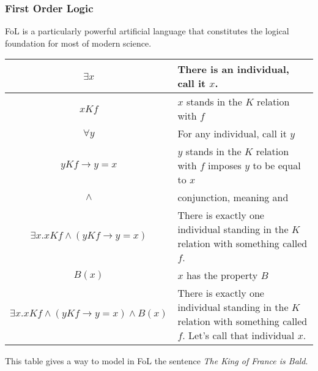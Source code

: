 \documentclass{cours}
\begin{document}
\subsubsection{First Order Logic}
FoL is a particularly powerful artificial language that constitutes the logical foundation for most of modern science.
\begin{center}
    \begin{tabular}{cp{}}
        $\exists x$                                                          & There is an individual, call it $x$.                                                                                    \\
        \midrule
        $xKf$                                                                & $x$ stands in the $K$ relation with $f$                                                                                 \\
        \midrule
        $\forall y$                                                          & For any individual, call it $y$                                                                                         \\
        \midrule
        $yKf \rightarrow y = x$                                              & $y$ stands in the $K$ relation with $f$ imposes $y$ to be equal to $x$                                                  \\
        \midrule
        $\wedge$                                                             & conjunction, meaning and                                                                                                \\
        \midrule
        $\exists x.xKf\wedge \left(yKf \rightarrow y = x\right)$             & There is exactly one individual standing in the $K$ relation with something called $f$.                                 \\
        \midrule
        $B(x)$                                                               & $x$ has the property $B$                                                                                                \\
        \midrule
        $\exists x.xKf\wedge \left(yKf \rightarrow y = x\right) \wedge B(x)$ & There is exactly one individual standing in the $K$ relation with something called $f$. Let's call that individual $x$.
    \end{tabular}
\end{center}
This table gives a way to model in FoL the sentence \textsl{The King of France is Bald}.
\end{document}
